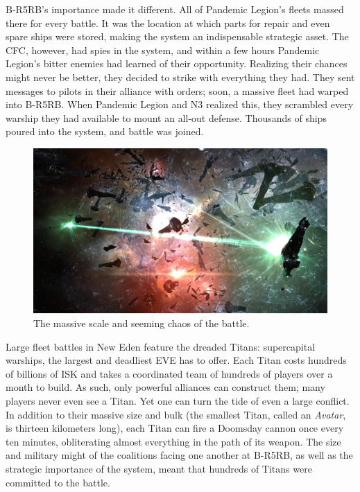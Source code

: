 \documentclass[letterpaper,12pt,article]{memoir}
\begin{document}
B-R5RB's importance made it different. All of Pandemic Legion's fleets massed
there for every battle. It was the location at which parts for repair and even
spare ships were stored, making the system an indispensable strategic asset. The
CFC, however, had spies in the system, and within a few hours Pandemic Legion's
bitter enemies had learned of their opportunity. Realizing their chances might
never be better, they decided to strike with everything they had. They sent
messages to pilots in their alliance with orders; soon, a massive fleet had
warped into B-R5RB. When Pandemic Legion and N3 realized this, they scrambled
every warship they had available to mount an all-out  defense. Thousands of 
ships poured into the system, and battle was joined. \cite{officialBR5RB}

\begin{figure}[ht]
    \centering
    \includegraphics[width=5in]{br5rb_screenshot.jpg}
    \caption{The massive scale and seeming chaos of the battle.
    \cite{officialBR5RB}}
    \label{fig:bloodbath}
\end{figure}

Large fleet battles in New Eden feature the dreaded Titans: supercapital
warships, the largest and deadliest EVE has to offer. Each Titan costs hundreds
of billions of ISK and takes a coordinated team of hundreds of players
over a month to build. As such, only powerful alliances can construct them; 
many players never even see a Titan. Yet one can turn the tide of even a large
conflict. In addition to their massive size and bulk (the smallest Titan, called
an \textit{Avatar}, is thirteen kilometers long), each Titan can fire a
Doomsday cannon once every ten minutes, obliterating almost everything in the
path of its weapon. The size and military might of the coalitions facing one
another at B-R5RB, as well as the strategic importance of the system, meant that 
hundreds of Titans were committed to the battle.
\end{document}
